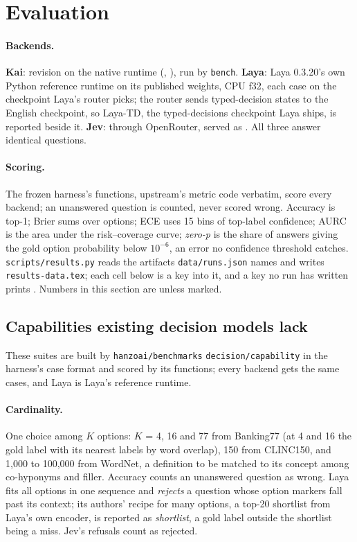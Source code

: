 \section{Evaluation}
\label{sec:evaluation}

\paragraph{Backends.}
\textbf{Kai}: revision  on the native runtime
(, ), run by \texttt{bench}.
\textbf{Laya}: Laya 0.3.20's own Python reference runtime on its published
weights, CPU f32, each case on the checkpoint Laya's router picks; the router
sends typed-decision states to the English checkpoint, so Laya-TD, the
typed-decisions checkpoint Laya ships, is reported beside it.
\textbf{Jev}:  through OpenRouter, served as
. All three answer identical questions.

\paragraph{Scoring.}
The frozen harness's functions, upstream's metric code verbatim, score every
backend; an unanswered question is counted, never scored wrong. Accuracy is
top-1; Brier sums over options; ECE uses 15 bins of top-label confidence; AURC
is the area under the risk--coverage curve; \emph{zero-p} is the share of
answers giving the gold option probability below $10^{-6}$, an error no
confidence threshold catches. \texttt{scripts/results.py} reads the artifacts
\texttt{data/runs.json} names and writes \texttt{results-data.tex}; each cell
below is a key into it, and a key no run has written prints \ph. Numbers in
this section are \meas{} unless marked.

\subsection{Capabilities existing decision models lack}
\label{sec:capabilities}

These suites are built by \texttt{hanzoai/benchmarks}
\texttt{decision/capability} in the harness's case format and scored by its
functions; every backend gets the same cases, and Laya is Laya's reference
runtime.

\paragraph{Cardinality.}
One choice among $K$ options: $K$ = 4, 16 and 77 from Banking77 (at 4 and 16
the gold label with its nearest labels by word overlap), 150 from CLINC150, and
1{,}000 to 100{,}000 from WordNet, a definition to be matched to its concept
among co-hyponyms and filler. Accuracy counts an unanswered question as wrong.
Laya fits all options in one sequence and \emph{rejects} a question whose
option markers fall past its context; its authors' recipe for many options,
a top-20 shortlist from Laya's own encoder, is reported as \emph{shortlist},
a gold label outside the shortlist being a miss. Jev's refusals count as
rejected.

